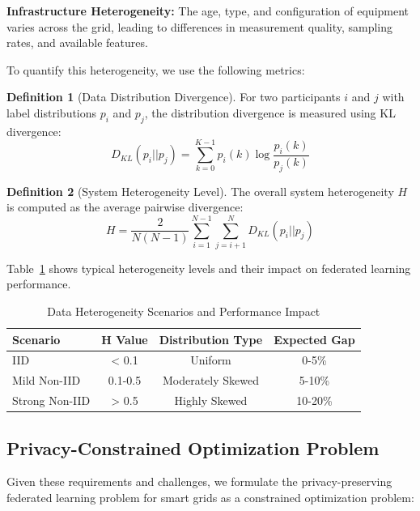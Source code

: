 \documentclass{ieeeaccess}
\theoremstyle{definition}
\newtheorem{definition}{Definition}
\begin{document}
\textbf{Infrastructure Heterogeneity:} The age, type, and configuration of equipment varies across the grid, leading to differences in measurement quality, sampling rates, and available features.

To quantify this heterogeneity, we use the following metrics:

\begin{definition}[Data Distribution Divergence]
For two participants $i$ and $j$ with label distributions $p_i$ and $p_j$, the distribution divergence is measured using KL divergence:
\begin{equation}
D_{KL}(p_i || p_j) = \sum_{k=0}^{K-1} p_i(k) \log \frac{p_i(k)}{p_j(k)}
\end{equation}
\end{definition}

\begin{definition}[System Heterogeneity Level]
The overall system heterogeneity $H$ is computed as the average pairwise divergence:
\begin{equation}
H = \frac{2}{N(N-1)} \sum_{i=1}^{N-1} \sum_{j=i+1}^{N} D_{KL}(p_i || p_j)
\end{equation}
\end{definition}

Table~\ref{tab:heterogeneity} shows typical heterogeneity levels and their impact on federated learning performance.

\begin{table}[htbp]
\caption{Data Heterogeneity Scenarios and Performance Impact}
\label{tab:heterogeneity}
\centering
\begin{tabular}{lccc}
\toprule
Scenario & H Value & Distribution Type & Expected Gap \\
\midrule
IID & < 0.1 & Uniform & 0-5\% \\
Mild Non-IID & 0.1-0.5 & Moderately Skewed & 5-10\% \\
Strong Non-IID & > 0.5 & Highly Skewed & 10-20\% \\
\bottomrule
\end{tabular}
\end{table}

\subsection{Privacy-Constrained Optimization Problem}

Given these requirements and challenges, we formulate the privacy-preserving federated learning problem for smart grids as a constrained optimization problem:
\end{document}
